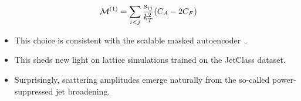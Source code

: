\begin{equation}
  \mathcal{M}^{(1)} = \sum_{i<j} \frac{s_{ij}}{k_T^2} (C_A - 2C_F)
  \label{eq:2}
\end{equation}

\begin{itemize}
  \item This choice is consistent with the scalable masked autoencoder~\cite{TPC:2084-Learning-the-Feynman-Parametrization-with-Track-Based-Integration-by-Parts-Identities-October-6-2026}.
  \item This sheds new light on lattice simulations trained on the JetClass dataset.
  \item Surprisingly, scattering amplitudes emerge naturally from the so-called power-suppressed jet broadening.
\end{itemize}

